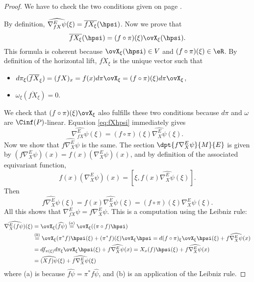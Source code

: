 \begin{proof}
	We have to check the two conditions given on page \pageref{sec:conn_vect}.

	By definition, $\widehat{\nabla_{fX}^E\psi}(\xi)=\overline{fX_{\xi}}(\hpsi)$. Now we prove that
	\begin{equation}\label{eq:fXhpsi}
		\overline{fX_{\xi}}(\hpsi)=(f\circ\pi)(\xi)\ovX_{\xi}(\hpsi).
	\end{equation}
	This formula is coherent because $\ovX_{\xi}(\hpsi)\in V$ and $(f\circ\pi)(\xi)\in\eR$. By definition of the horizontal lift, $\overline{fX}_{\xi}$ is the unique vector such that

	\begin{itemize}
		\item $d\pi_{\xi}(\overline{fX}_{\xi})=(fX)_x=f(x)d\pi\ovX_{\xi}=(f\circ\pi)(\xi)d\pi\ovX_{\xi}$,
		\item $\omega_{\xi}(\overline{fX}_{\xi})=0$.
	\end{itemize}
	We check that $(f\circ\pi)(\xi)\ovX_{\xi}$ also fulfills these two conditions because $d\pi$ and $\omega$ are $\Cinf(P)$-linear. Equation \eqref{eq:fXhpsi} immediately gives
	\begin{equation}
		\widehat{\nabla_{fX}^E\psi}(\xi)=(f\circ\pi)(\xi)\widehat{\nabla_X^E\psi}(\xi).
	\end{equation}
	Now we show that $\widehat{ f\nabla_X^E\psi }$ is the same. The section $\dpt{f\nabla_X^E\psi}{M}{E}$ is given by  $(f\nabla_X^E\psi)(x)=f(x)(\nabla_X^E\psi)(x)$, and by definition of the associated equivariant function,
	\[
		f(x)(\nabla_X^E\psi)(x)=[ \xi,f(x)\widehat{\nabla_X^E\psi}(\xi) ].
	\]
	Then
	\begin{equation}
		\widehat{f\nabla_X^E\psi}(\xi)=f(x)\widehat{\nabla_X^E\psi}(\xi)=(f\circ\pi)(\xi)\widehat{\nabla_X^E\psi}(\xi).
	\end{equation}
	All this shows that
	$  \nabla_{fX}^E\psi=f\nabla_X^E\psi$.
	This is a computation using the Leibniz rule:
	\begin{equation}
		\begin{split}
			\widehat{\nabla_X^E(f\psi)}(\xi)&=\ovX_{\xi}( \widehat{f\psi} )
			\stackrel{(a)}{=}\ovX_{\xi}((\pi\circ f)\hpsi)\\
			&\stackrel{(b)}{=}\ovX_{\xi}(\pi^*f)\hpsi(\xi)+(\pi^*f)(\xi)\ovX_{\xi}\hpsi
			=d(f\circ\pi)_{\xi}\ovX_{\xi}\hpsi(\xi)+f\widehat{\nabla_X^E\psi}(x)\\
			&=df_{\pi(\xi)}d\pi_{\xi}\ovX_{\xi}\hpsi(\xi)+f\widehat{\nabla_X^E\psi}(x)
			=X_x(f)\hpsi(\xi)+f\widehat{\nabla_X^E\psi}(x)\\
			&=\widehat{(Xf)\psi}(\xi)+\widehat{f\nabla_X^E\psi}(\xi)
		\end{split}
	\end{equation}
	where (a) is because $\widehat{f\psi}=\pi^*f\hat{\psi}$, and (b) is an application of the Leibniz rule.
\end{proof}




